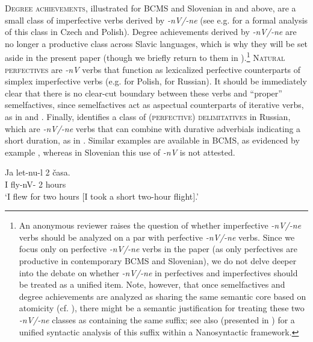 \documentclass[output=paper,colorlinks,citecolor=brown]{langscibook}
\begin{document}
\noindent\textsc{Degree achievements}, illustrated for BCMS and Slovenian in  and  above, are a small class of imperfective verbs derived by \textit{-nV/-ne} (see e.g. \citealt{TaraldsenMedovaWiland2019} for a formal analysis of this class in Czech and Polish). Degree achievements derived by \textit{-nV/-ne} are no longer a productive class across Slavic languages, which is why they will be set aside in the present paper (though we briefly return to them in ).\footnote{An anonymous reviewer raises the question of whether imperfective \textit{-nV/-ne} verbs should be analyzed on a par with perfective \textit{-nV/-ne} verbs. Since we focus only on perfective \textit{-nV/-ne} verbs in the paper (as only perfectives are productive in contemporary BCMS and Slovenian), we do not delve deeper into the debate on whether \textit{-nV/-ne} in perfectives and imperfectives should be treated as a unified item. Note, however, that once semelfactives and degree achievements are analyzed as sharing the same semantic core based on atomicity (cf. \citealt{Rothstein2008Telicity, Rothstein2008Puzzles}), there might be a semantic justification for treating these two \textit{-nV/-ne} classes as containing the same suffix; see also \citet{TaraldsenMedovaWiland2019} (presented in ) for a unified syntactic analysis of this suffix within a Nanosyntactic framework. 
}
\textsc{Natural perfectives} are \textit{-nV} verbs that function as lexicalized perfective counterparts of simplex imperfective verbs (e.g. \citealt{Bacz2012} for Polish, \citealt{Sokolova2015} for Russian). It should be immediately clear that there is no clear-cut boundary between these verbs and ``proper'' semelfactives, since semelfactives act as aspectual counterparts of iterative verbs, as in  and .
Finally, \citet{Sokolova2015} identifies a class of \textsc{(perfective) delimitatives} in Russian, which are \textit{-nV/-ne} verbs that can combine with durative adverbials indicating a short duration, as in . Similar examples are available in BCMS, as evidenced by example , whereas in Slovenian this use of \textit{-nV} is not attested. %

\ea\label{str:ex:RusLet}
\gll Ja let-nu-l 2 časa.\\
I fly-nV-{\PST} 2 hours\\ 
\glt `I flew for two hours $[$I took a short two-hour flight$]$.'
\end{document}
